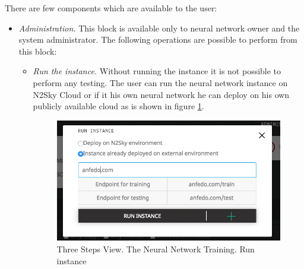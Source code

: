 There are few components which are available to the user:
\begin{itemize}
\item \emph{Administration.} This block is available only to neural network owner and the system administrator. The following operations are possible to perform from this block:
\begin{itemize}
\item \emph{Run the instance.} Without running the instance it is not possible to perform any testing. The user can run the neural network instance on N2Sky Cloud or if it his own neural network he can deploy on his own publicly available cloud as is shown in figure \ref{fig:run_instance_3_steps}. 

\begin{figure}[H]
\begin{center}
  \includegraphics[scale=0.5]{components/5/img/run_instance_3_steps.png}
  \caption{Three Steps View. The Neural Network Training. Run instance}
  \label{fig:run_instance_3_steps}
\end{center}
\end{figure}


\end{itemize}
\end{itemize}
